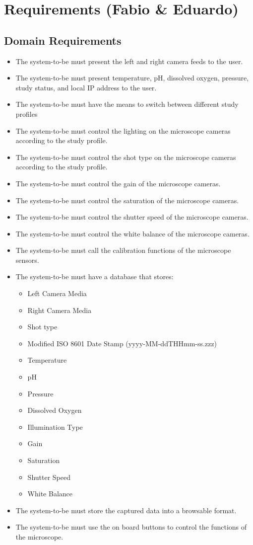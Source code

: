 \section{Requirements (Fabio \& Eduardo)}
\subsection{Domain Requirements}
\begin{itemize}
	\item The system-to-be must present the left and right camera feeds to the user.
	\item The system-to-be must present temperature, pH, dissolved oxygen, pressure, study status, and local IP address to the user.
	\item The system-to-be must have the means to switch between different study profiles
	\item The system-to-be must control the lighting on the microscope cameras according to the study profile.
	\item The system-to-be must control the shot type on the microscope cameras according to the study profile.
	\item The system-to-be must control the gain of the microscope cameras.
	\item The system-to-be must control the saturation of the microscope cameras.
	\item The system-to-be must control the shutter speed of the microscope cameras.
	\item The system-to-be must control the white balance of the microscope cameras.
	\item The system-to-be must call the calibration functions of the microscope sensors.
	\item The system-to-be must have a database that stores:
	      \begin{itemize}
		      \item Left Camera Media
		      \item Right Camera Media
		      \item Shot type
		      \item Modified ISO 8601 Date Stamp (yyyy-MM-ddTHHmm-ss.zzz)
		      \item Temperature
		      \item pH
		      \item Pressure
		      \item Dissolved Oxygen
		      \item Illumination Type
		      \item Gain
		      \item Saturation
		      \item Shutter Speed
		      \item White Balance
	      \end{itemize}
	\item The system-to-be must store the captured data into a browsable format.
	\item The system-to-be must use the on board buttons to control the functions of the microscope.
\end{itemize}
